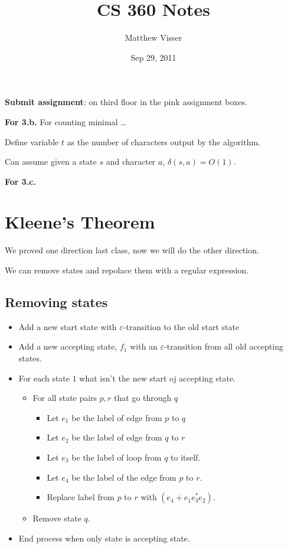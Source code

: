 \documentclass[12pt]{article}
\begin{document}
\title{CS 360 Notes}
\author{Matthew Visser}
\date{Sep 29, 2011}
\maketitle

\textbf{Submit assignment}: on third floor in the pink assignment boxes.

\textbf{For 3.b.}
For counting minimal \dots

Define variable $t$ as the number of characters output by the algorithm.

Can assume given a state $s$ and character $a$, $\delta(s,a) = O(1)$.

\textbf{For 3.c.}

\section{Kleene's Theorem}

We proved one direction last class, now we will do the other direction.

We can remove states and repolace them with a regular expression.

\subsection{Removing states}

\begin{itemize}
    \item Add a new start state with $\varepsilon$-transition to the old start
        state
    \item Add a new accepting state, $f_1$ with an $\varepsilon$-transition from
        all old accepting states.
    \item For each state $1$ what isn't the new start oj accepting state.
        \begin{itemize}
            \item For all state pairs $p,r$ that go through $q$
                \begin{itemize}
                    \item Let $e_1$ be the label of edge from $p$ to $q$
                    \item Let $e_2$ be the label of edge from $q$ to $r$
                    \item Let $e_3$ be the label of loop from $q$ to itself.
                    \item Let $e_4$ be the label of the edge from $p$ to $r$.
                    \item Replace label from $p$ to $r$ with $(e_4 +
                        e_1e_3^*e_2)$.
                \end{itemize}
            \item Remove state $q$.
        \end{itemize}
    \item End process when only state is accepting state.
\end{itemize}
\end{document}
